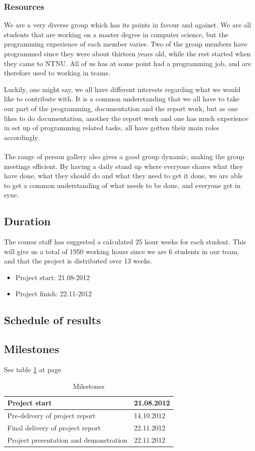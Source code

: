 \subsubsection{Resources}
We are a very diverse group which has its points in favour and against. We are all students that are working on a master degree in computer science, but the programming experience of each member varies. Two of the group members have programmed since they were about thirteen years old, while the rest started when they came to NTNU. All of us has at some point had a programming job, and are therefore used to working in teams. 

\newpage
Luckily, one might say, we all have different interests regarding what we would like to contribute with. It is a common understanding that we all have to take our part of the programming, documentation and the report work, but as one likes to do documentation, another the report work and one has much experience in set up of programming related tasks, all have gotten their main roles accordingly. 
\\
\\
The range of person gallery also gives a good group dynamic, making the group meetings efficient. By having a daily stand up where everyone shares what they have done, what they should do and what they need to get it done, we are able to get a common understanding of what needs to be done, and everyone get in sync.

\subsection{Duration}
The course staff has suggested a calculated 25 hour weeks for each student. This will give us a total of 1950 working hours since we are 6 students in our team, and that the project is distributed over 13 weeks.

\begin{itemize}
\item{}Project start: 21.08-2012
\item{}Project finish: 22.11-2012
\end{itemize}

\subsection{Schedule of results}

\subsection*{Milestones}
See table \ref{tab:milestones} at page \pageref{tab:milestones}
\begin{table}
\begin{tabular}{l|l}
Project start &  21.08.2012\\ \hline
Pre-delivery of project report & 14.10.2012\\ \hline
Final delivery of project report & 22.11.2012\\ \hline
Project presentation and demonstration & 22.11.2012
\end{tabular}
\caption{Milestones} \label{tab:milestones}
\end{table}

